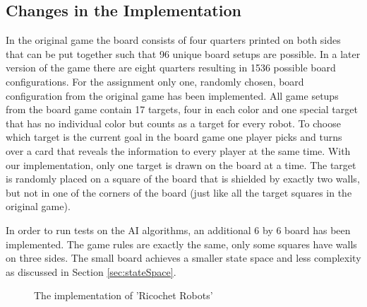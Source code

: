 \documentclass[a4paper,10pt]{article}
\begin{document}
  \subsection{Changes in the Implementation}
  In the original game the board consists of four quarters printed on both sides that can be put together such that 96 unique board setups are possible. In a later version of the game there are eight quarters resulting in 1536 possible board configurations. For the assignment only one, randomly chosen, board configuration from the original game has been implemented. All game setups from the board game contain 17 targets, four in each color and one special target that has no individual color but counts as a target for every robot. To choose which target is the current goal in the board game one player picks and turns over a card that reveals the information to every player at the same time. With our implementation, only one target is drawn on the board at a time. The target is randomly placed on a square of the board that is shielded by exactly two walls, but not in one of the corners of the board (just like all the target squares in the original game).
  \par
  In order to run tests on the AI algorithms, an additional 6 by 6 board has been implemented. The game rules are exactly the same, only some squares have walls on three sides. The small board achieves a smaller state space and less complexity as discussed in Section \ref{sec:stateSpace}.
  \begin{figure}[!htb]
  \caption{The implementation of 'Ricochet Robots'}
  \label{fig:implementation}
  \end{figure}
\end{document}
